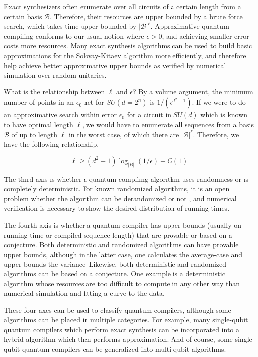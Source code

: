 Exact synthesizers often enumerate over all circuits of
a certain length from a certain basis $\mathcal{B}$. Therefore, their
resources are upper bounded by a brute force search, which takes
time upper-bounded by $|\mathcal{B}|^{\ell}$.
Approximative quantum compiling conforms to our usual notion where
$\epsilon > 0$, and achieving smaller error costs more resources. Many
exact synthesis algorithms can be used to build basic approximations
for the Solovay-Kitaev algorithm more efficiently, and therefore help
achieve better approximative upper bounds as verified by numerical
simulation over random unitaries.

What is the relationship between $\ell$ and $\epsilon$? By a volume
argument, the minimum number of points in an $\epsilon_0$-net for
$SU(d=2^n)$ is $1/(\epsilon^{d^2 - 1})$. If we were to do an approximative
search within error $\epsilon_0$
for a circuit in $SU(d)$ which is known to have optimal length
$\ell$, we would have to enumerate all sequences from a basis $\mathcal{B}$
of up to length $\ell$ in the worst case, of which there are $|\mathcal{B}|^{\ell}$.
Therefore, we have the following relationship.

\begin{equation}
\ell \ge (d^2 - 1) \log_{|B|}(1/\epsilon) + O(1)
\end{equation}

The third axis is whether a quantum compiling algorithm uses randomness
or is completely deterministic. For known randomized algorithms, it is
an open problem whether the algorithm can be derandomized or not
\cite{Kliuchnikov2012a}, and numerical verification is necessary to
show the desired distribution of running times.

The fourth axis is whether a quantum compiler has upper bounds
(usually on running time or compiled sequence length) that are provable or
based on a conjecture. Both deterministic and randomized
algorithms can have provable upper bounds, although
in the latter case, one calculates the average-case and upper bounds the
variance. Likewise, both deterministic and randomized algorithms can
be based on a conjecture. One example is a deterministic algorithm
whose resources are too difficult to compute in any other way than
numerical simulation and fitting a curve to the data.

These four axes can be used to classify quantum compilers, although some
algorithms can be placed in multiple categories. For example, many
single-qubit quantum compilers which perform exact synthesis can be
incorporated into a hybrid algorithm which then performs
approximation. And of course, some single-qubit quantum compilers can be generalized
into multi-qubit algorithms.

